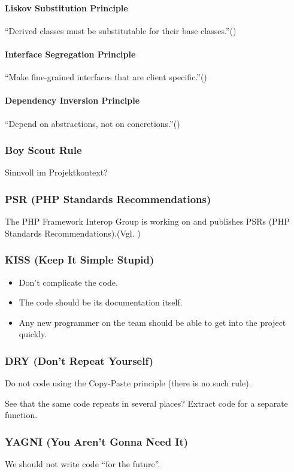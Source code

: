 \paragraph{Liskov Substitution Principle}
\enquote{Derived classes must be substitutable for their base classes.}(\cite{solid})

\paragraph{Interface Segregation Principle}
\enquote{Make fine-grained interfaces that are client specific.}(\cite{solid})

\paragraph{Dependency Inversion Principle}
\enquote{Depend on abstractions, not on concretions.}(\cite{solid})

\subsubsection{Boy Scout Rule}
Sinnvoll im Projektkontext?
\subsubsection{PSR (PHP Standards Recommendations)}
The PHP Framework Interop Group is working on and publishes PSRs (PHP Standards Recommendations).(Vgl. \cite{psr})

\subsubsection{KISS (Keep It Simple Stupid)}
\begin{itemize}
    \item Don't complicate the code.
    \item The code should be its documentation itself.
    \item Any new programmer on the team should be able to get into the project quickly.
\end{itemize}
\subsubsection{DRY (Don’t Repeat Yourself)}
Do not code using the Copy-Paste principle (there is no such rule).

See that the same code repeats in several places? Extract code for a separate function.
\subsubsection{YAGNI (You Aren’t Gonna Need It)}
We should not write code “for the future”.

